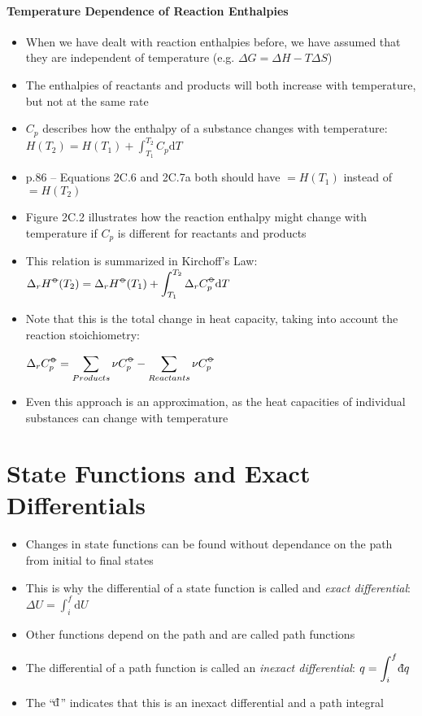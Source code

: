 \documentclass[12pt, openany, letterpaper]{memoir}
\begin{document}
\paragraph{Temperature Dependence of Reaction Enthalpies}
\begin{itemize}
	\item When we have dealt with reaction enthalpies before, we have assumed that they are independent of temperature (e.g. $\Delta G = \Delta H-T\Delta S$)
	\item The enthalpies of reactants and products will both increase with temperature, but not at the same rate
	\item $C_{p}$ describes how the enthalpy of a substance changes with temperature:
	$H(T_2)=H(T_1)+\displaystyle\int_{T_1}^{T_2}C_p\mathrm{d}T$
	\item p.86 -- Equations 2C.6 and 2C.7a both should have $=H(T_1)$  instead of $=H(T_2)$
	\item Figure 2C.2 illustrates how the reaction enthalpy might change with temperature if $C_p$ is different for reactants and products
	\item This relation is summarized in Kirchoff's Law: $\Delta_rH^{\std}(T_2)=\Delta_rH^{\std}(T_1)+\displaystyle\int_{T_1}^{T_2}\Delta_rC_p^{\std}\mathrm{d}T$
	\item Note that this is the total change in heat capacity, taking into account the reaction stoichiometry:
	
	$\Delta_rC_p^{\std}=\displaystyle\sum\limits_{Products}\nu C_p^{\std} - \displaystyle\sum\limits_{Reactants}\nu C_p^{\std}$
	\item Even this approach is an approximation, as the heat capacities of individual substances can change with temperature
\end{itemize}

\section{State Functions and Exact Differentials}
\begin{itemize}
	\item Changes in state functions can be found without dependance on the path from initial to final states
	\item This is why the differential of a state function is called and \emph{exact differential}: $\Delta U = \displaystyle\int_i^f\mathrm{d}U$
	\item Other functions depend on the path and are called path functions
	\item The differential of a path function is called an \emph{inexact differential}: $q=\displaystyle\int_i^f\dbar q$
	\item The ``$\dbar$'' indicates that this is an inexact differential and a path integral
\end{itemize}
\end{document}
